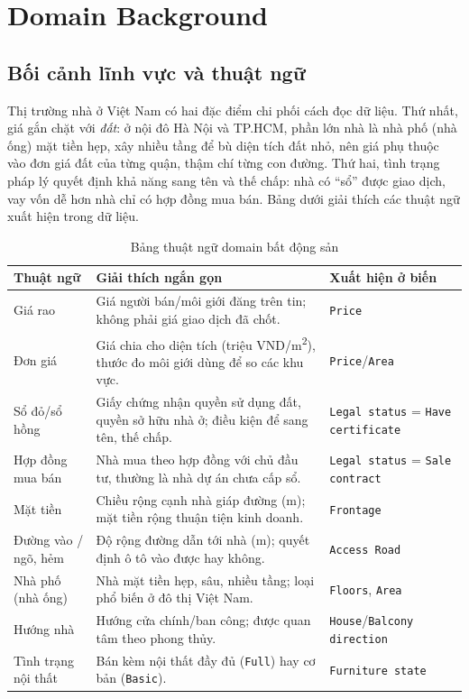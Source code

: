 \documentclass[11pt]{article}
\newcommand{\trm}{triệu VND/m\textsuperscript{2}}
\begin{document}
\section{Domain Background}

\subsection{Bối cảnh lĩnh vực và thuật ngữ}

Thị trường nhà ở Việt Nam có hai đặc điểm chi phối cách đọc dữ liệu. Thứ nhất, giá gắn chặt với
\textit{đất}: ở nội đô Hà Nội và TP.HCM, phần lớn nhà là nhà phố (nhà ống) mặt tiền hẹp, xây nhiều tầng
để bù diện tích đất nhỏ, nên giá phụ thuộc vào đơn giá đất của từng quận, thậm chí từng con đường.
Thứ hai, tình trạng pháp lý quyết định khả năng sang tên và thế chấp: nhà có ``sổ'' được giao dịch,
vay vốn dễ hơn nhà chỉ có hợp đồng mua bán. Bảng dưới giải thích các thuật ngữ xuất hiện trong dữ liệu.

\begin{table}[H]
\centering
\small
\caption{Bảng thuật ngữ domain bất động sản}
\begin{tabular}{@{}L{0.22\textwidth}L{0.48\textwidth}L{0.22\textwidth}@{}}
\toprule
\textbf{Thuật ngữ} & \textbf{Giải thích ngắn gọn} & \textbf{Xuất hiện ở biến} \\
\midrule
Giá rao & Giá người bán/môi giới đăng trên tin; không phải giá giao dịch đã chốt. & \texttt{Price} \\
Đơn giá & Giá chia cho diện tích (\trm), thước đo môi giới dùng để so các khu vực. & \texttt{Price}/\texttt{Area} \\
Sổ đỏ/sổ hồng & Giấy chứng nhận quyền sử dụng đất, quyền sở hữu nhà ở; điều kiện để sang tên, thế chấp. & \texttt{Legal status} = \texttt{Have certificate} \\
Hợp đồng mua bán & Nhà mua theo hợp đồng với chủ đầu tư, thường là nhà dự án chưa cấp sổ. & \texttt{Legal status} = \texttt{Sale contract} \\
Mặt tiền & Chiều rộng cạnh nhà giáp đường (m); mặt tiền rộng thuận tiện kinh doanh. & \texttt{Frontage} \\
Đường vào / ngõ, hẻm & Độ rộng đường dẫn tới nhà (m); quyết định ô tô vào được hay không. & \texttt{Access Road} \\
Nhà phố (nhà ống) & Nhà mặt tiền hẹp, sâu, nhiều tầng; loại phổ biến ở đô thị Việt Nam. & \texttt{Floors}, \texttt{Area} \\
Hướng nhà & Hướng cửa chính/ban công; được quan tâm theo phong thủy. & \texttt{House}/\texttt{Balcony direction} \\
Tình trạng nội thất & Bán kèm nội thất đầy đủ (\texttt{Full}) hay cơ bản (\texttt{Basic}). & \texttt{Furniture state} \\
\bottomrule
\end{tabular}
\end{table}
\end{document}
